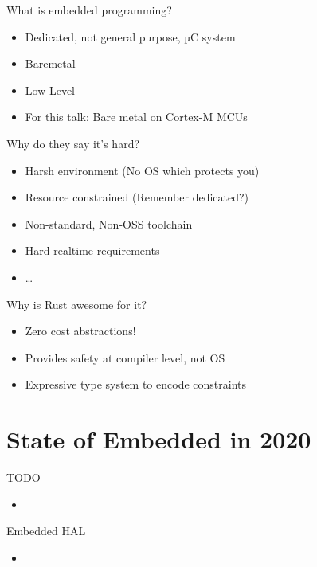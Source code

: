 \documentclass[aspectratio=1610,14pt,t]{beamer}
\begin{document}
\begin{frame}[c]{What is embedded programming?}
  \begin{itemize}
    \item Dedicated, not general purpose, µC system
    \item<1-> Baremetal
    \item<1-> Low-Level
    \item<2-> For this talk: Bare metal on Cortex-M MCUs
  \end{itemize}
\end{frame}

\begin{frame}[c]{Why do they say it's hard?}
  \begin{itemize}
    \item Harsh environment (No OS which protects you)
    \item Resource constrained (Remember dedicated?)
    \item Non-standard, Non-OSS toolchain
    \item Hard realtime requirements
    \item \ldots
  \end{itemize}
\end{frame}

\begin{frame}[c]{Why is Rust awesome for it?}
  \begin{itemize}
    \item Zero cost abstractions!
    \item Provides safety at compiler level, not OS
    \item Expressive type system to encode constraints
  \end{itemize}
\end{frame}

\section{State of Embedded in 2020}
\begin{frame}[c]{TODO}
  \begin{itemize}
  \item
  \end{itemize}
\end{frame}

\begin{frame}[c]{Embedded HAL}
  \begin{itemize}
  \item
  \end{itemize}
\end{frame}
\end{document}
